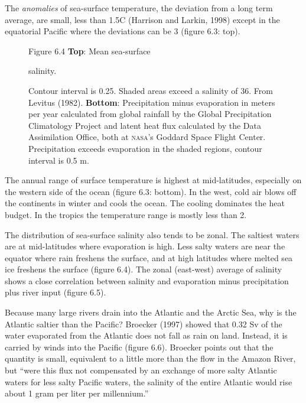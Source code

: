 The \textit{anomalies} of sea-surface temperature, the deviation from a
long term average, are small, less than 1.5\degrees C (Harrison and
Larkin, 1998) except in the equatorial Pacific where the deviations
can be 3 (figure 6.3: top).

\begin{figure}[t!]
\footnotesize
Figure 6.4 \textbf{Top}: Mean sea-surface \rule{0pt}{3ex}
salinity. \rule{0mm}{2ex}Contour interval is 0.25. Shaded areas exceed
a salinity of 36. From Levitus (1982).  \textbf{Bottom}: Precipitation
minus evaporation in meters per year calculated from global
rainfall by the Global Precipitation
Climatology Project and latent heat flux calculated by the Data
Assimilation Office, both at \textsc{nasa}'s Goddard Space Flight
Center. Precipitation exceeds evaporation in the shaded regions,
contour interval is 0.5 m.

\label{fig:salinity}
\vspace{-3ex}
\end{figure}

The annual range of surface temperature is highest at mid-latitudes,
especially on the western side of the ocean (figure 6.3: bottom). In
the west, cold air blows off the continents in winter and cools the
ocean. The cooling dominates the heat budget. In the tropics the
temperature range is mostly less than 2.

The distribution of sea-surface salinity also tends to be zonal. The
saltiest waters are at mid-latitudes where evaporation is high. Less
salty waters are near the equator where rain freshens the surface, and
at high latitudes where melted sea ice freshens the surface (figure
6.4). The zonal (east-west) average of salinity shows a close
correlation between salinity and evaporation minus precipitation plus
river input (figure 6.5).

Because many large rivers drain into the Atlantic and the Arctic Sea,
why is the Atlantic saltier than the Pacific? Broecker (1997) showed
that 0.32 Sv of the water evaporated from the Atlantic does not fall
as rain on land. Instead, it is carried by winds into the Pacific
(figure 6.6). Broecker points out that the quantity is small,
equivalent to a little more than the flow in the Amazon River, but
``were this flux not compensated by an exchange of more salty Atlantic
waters for less salty Pacific waters, the salinity of the entire
Atlantic would rise about 1 gram per liter per millennium.''


